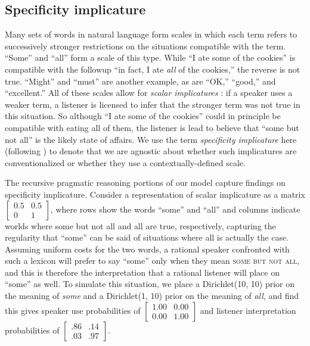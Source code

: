 \documentclass{article} %
\begin{document}
\subsection{Specificity implicature}

Many sets of words in natural language form scales in which each term refers to successively stronger restrictions on the situations compatible with the term. ``Some'' and ``all'' form a scale of this type. While ``I ate some of the cookies'' is compatible with the followup ``in fact, I ate {\it all} of the cookies,'' the reverse is not true. ``Might'' and ``must'' are another example, as are ``OK,'' ``good,'' and ``excellent.'' All of these scales allow for {\it scalar implicatures} \cite{grice1975}: if a speaker uses a weaker term, a listener is licensed to infer that the stronger term was not true in this situation. So although ``I ate some of the cookies'' could in principle be compatible with eating all of them, the listener is lead to believe that ``some but not all'' is the likely state of affairs. We use the term {\it specificity implicature} here (following \cite{bergen2012}) to denote that we are agnostic about whether such implicatures are conventionalized or whether they use a contextually-defined scale.

The recursive pragmatic reasoning portions of our model capture findings on specificity implicature. Consider a representation of scalar implicature as a matrix 
$\left[
    \begin{array}{cc}
      0.5 & 0.5 \\
      0 & 1
    \end{array} 
  \right]$,
where rows show the words ``some'' and ``all'' and columns indicate worlds where {\sc some but not all} and {\sc all} are true, respectively, capturing the regularity that ``some'' can be said of situations where {\sc all} is actually the case. Assuming uniform costs for the two words, a rational speaker confronted with such a lexicon will prefer to say ``some'' only when they mean \textsc{some but not all}, and this is therefore the interpretation that a rational listener will place on ``some'' as well. To simulate this situation, we place a Dirichlet(10, 10) prior on the meaning of \textit{some} and a Dirichlet(1, 10) prior on the meaning of \textit{all}, and find this gives speaker use probabilities of 
$\left[
    \begin{array}{cc}
      1.00 & 0.00 \\
      0.00 & 1.00
    \end{array} 
  \right]$
and listener interpretation probabilities of 
$\left[
    \begin{array}{cc}
      .86 & .14 \\
      .03 & .97
    \end{array} 
  \right]$.
\end{document}
